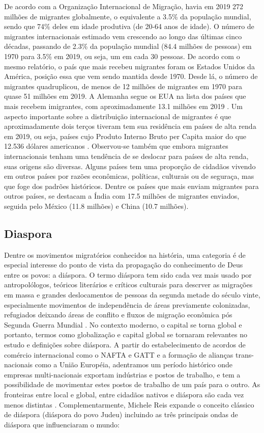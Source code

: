 \documentclass[
	12pt,				%
	openright,			%
	twoside,			%
	a4paper,			%
	english,			%
	french,				%
	spanish,			%
	brazil				%
	]{abntex2}
\begin{document}
De acordo com a Organização Internacional de Migração, havia em 2019 272 milhões de migrantes globalmente, o equivalente a 3.5\% da população mundial, sendo que 74\% deles em idade produtiva (de 20-64 anos de idade). O número de migrantes internacionais estimado vem crescendo ao longo das últimas cinco décadas, passando de 2.3\% da população mundial (84.4 milhões de pessoas) em 1970 para 3.5\% em 2019, ou seja, um em cada 30 pessoas. De acordo com o mesmo relatório, o país que mais recebeu migrantes foram os Estados Unidos da América, posição essa que vem sendo mantida desde 1970. Desde lá, o número de migrantes quadruplicou, de menos de 12 milhões de migrantes em 1970 para quase 51 milhões em 2019. A Alemanha segue os EUA na lista dos países que mais recebem imigrantes, com aproximadamente 13.1 milhões em 2019 \cite[21]{iom2020}. Um aspecto importante sobre a distribuição internacional de migrantes é que aproximadamente dois terços tiveram tem sua residência em países de alta renda em 2019, ou seja, países cujo Produto Interno Bruto per Capita maior do que 12.536 dólares americanos \cite{world_bank_country_lending_groups}. Observou-se também que embora migrantes internacionais tenham uma tendência de se deslocar para países de alta renda, suas origens são diversas. Alguns países tem uma proporção de cidadãos vivendo em outros países por razões econômicas, políticas, culturais ou de seguraça, mas que foge dos padrões históricos\cite[45]{iom2020}. Dentre os países que mais enviam migrantes para outros países, se destacam a Índia com 17.5 milhões de migrantes enviados, seguida pelo México (11.8 milhões) e China (10.7 milhões). 

\subsection{Diaspora}

Dentre os movimentos migratórios conhecidos na história, uma categoria é de especial interesse do ponto de vista da propagação do conhecimento de Deus entre os povos: a diáspora. O termo diáspora tem sido cada vez mais usado por antropolólogos, teóricos literários e críticos culturais para descrver as migrações em massa e grandes deslocamentos de pessoas da segunda metade do século vinte, especialmente movimentos de independência de áreas previamente colonizadas, refugiados deixando áreas de conflito e fluxos de migração econômica pós Segunda Guerra Mundial \cite[11]{braziel_theorizing_2008}. No contexto moderno, o capital se torna global e portanto, termos como globalização e capital global se tornaram relevantes no estudo e definições sobre diáspora. A partir do estabelecimento de acordos de comércio internacional como o NAFTA e GATT e a formação de alianças trans-nacionais como a União Européia, adentramos um período histórico onde empresas multi-nacionais exportam indústrias e postos de trabalho, e tem a possibilidade de movimentar estes postos de trabalho de um país para o outro. As fronteiras entre local e global, entre cidadãos nativos e diáspora são cada vez menos distintas \cite[19]{braziel_theorizing_2008}. Complementarmente, Michele Reis expande o conceito clássico de diáspora (diáspora do povo Judeu) incluindo as três principais ondas de diáspora que influenciaram o mundo: 
\end{document}
